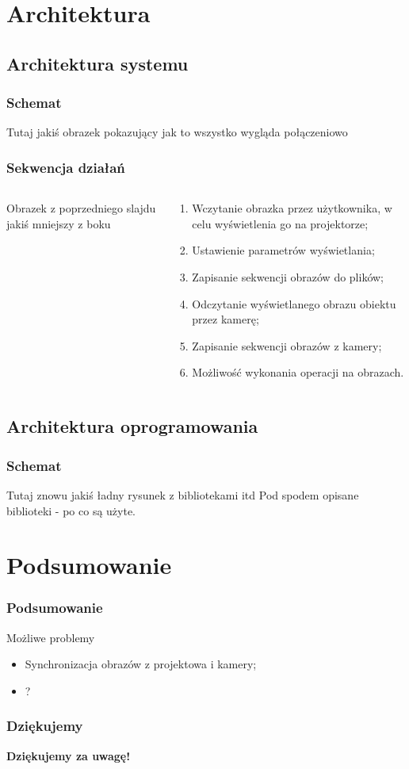 \documentclass{beamer}
\begin{document}
\section{Architektura}
\subsection{Architektura systemu}
\begin{frame}\frametitle{Schemat}
  Tutaj jakiś obrazek pokazujący jak to wszystko wygląda połączeniowo
\end{frame}

\begin{frame}\frametitle{Sekwencja działań}
  \begin{columns}
    \begin{column}{4cm}
      Obrazek z poprzedniego slajdu jakiś mniejszy z boku
    \end{column}
    
    \begin{column}{8cm}
      \begin{enumerate}
       \item Wczytanie obrazka przez użytkownika, w celu wyświetlenia go na projektorze;\pause
       \item Ustawienie parametrów wyświetlania;\pause
       \item Zapisanie sekwencji obrazów do plików;\pause
       \item Odczytanie wyświetlanego obrazu obiektu przez kamerę;\pause
       \item Zapisanie sekwencji obrazów z kamery;\pause
       \item Możliwość wykonania operacji na obrazach.
      \end{enumerate}
    \end{column}
  \end{columns}
\end{frame}

\subsection{Architektura oprogramowania}
\begin{frame}\frametitle{Schemat}
  Tutaj znowu jakiś ładny rysunek z bibliotekami itd
  Pod spodem opisane biblioteki - po co są użyte.
\end{frame}

\section{Podsumowanie}
\begin{frame}\frametitle{Podsumowanie}
  \begin{alertblock}{Możliwe problemy}
    \begin{itemize}
     \item Synchronizacja obrazów z projektowa i kamery;
     \item ?
    \end{itemize}
  \end{alertblock}
\end{frame}

\begin{frame}\frametitle{Dziękujemy}
\begin{center}
  \Huge{\textbf{Dziękujemy za uwagę!}}
\end{center}
\end{frame}
\end{document}
